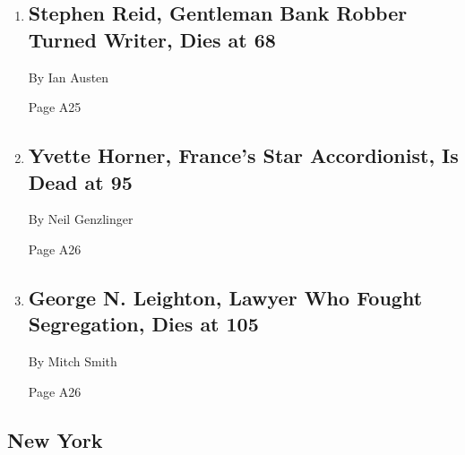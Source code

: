 \begin{enumerate}
\def\labelenumi{\arabic{enumi}.}
\item
  \href{/2018/06/15/obituaries/stephen-reid-gentleman-bank-robber-turned-writer-dies-at-68.html}{}

  \hypertarget{stephen-reid-gentleman-bank-robber-turned-writer-dies-at-68}{%
  \subsection{Stephen Reid, Gentleman Bank Robber Turned Writer, Dies at
  68}\label{stephen-reid-gentleman-bank-robber-turned-writer-dies-at-68}}

  By Ian Austen

  Page A25
\item
  \href{/2018/06/15/obituaries/yvette-horner-frances-star-accordionist-is-dead-at-95.html}{}

  \hypertarget{yvette-horner-frances-star-accordionist-is-dead-at-95}{%
  \subsection{Yvette Horner, France's Star Accordionist, Is Dead at
  95}\label{yvette-horner-frances-star-accordionist-is-dead-at-95}}

  By Neil Genzlinger

  Page A26
\item
  \href{/2018/06/15/obituaries/george-leighton-dies-chicago.html}{}

  \hypertarget{george-n-leighton-lawyer-who-fought-segregation-dies-at-105}{%
  \subsection{George N. Leighton, Lawyer Who Fought Segregation, Dies at
  105}\label{george-n-leighton-lawyer-who-fought-segregation-dies-at-105}}

  By Mitch Smith

  Page A26
\end{enumerate}

\hypertarget{new-york}{%
\subsection{New York}\label{new-york}}

